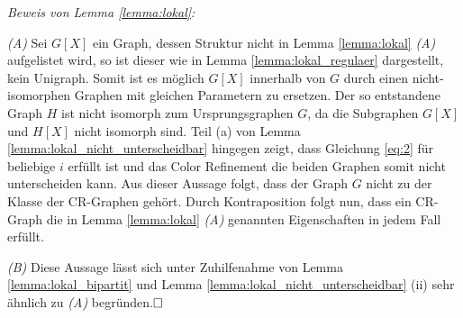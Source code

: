 \emph{Beweis von Lemma \ref{lemma:lokal}:}

\emph{(A)} Sei $G[X]$ ein Graph, dessen Struktur nicht in Lemma \ref{lemma:lokal} \emph{(A)} aufgelistet wird, so ist dieser wie in Lemma \ref{lemma:lokal_regulaer} dargestellt, kein Unigraph. Somit ist es möglich $G[X]$ innerhalb von $G$ durch einen nicht-isomorphen Graphen mit gleichen Parametern zu ersetzen. Der so entstandene Graph $H$ ist nicht isomorph zum Ursprungsgraphen $G$, da die Subgraphen $G[X]$ und $H[X]$ nicht isomorph sind. Teil (a) von Lemma \ref{lemma:lokal_nicht_unterscheidbar} hingegen zeigt, dass Gleichung \ref{eq:2} für beliebige $i$ erfüllt ist und das Color Refinement die beiden Graphen somit nicht unterscheiden kann. Aus dieser Aussage folgt, dass der Graph $G$ nicht zu der Klasse der CR-Graphen gehört. Durch Kontraposition folgt nun, dass ein CR-Graph die in Lemma \ref{lemma:lokal} \emph{(A)} genannten Eigenschaften in jedem Fall erfüllt.

\emph{(B)} Diese Aussage lässt sich unter Zuhilfenahme von Lemma \ref{lemma:lokal_bipartit} und Lemma \ref{lemma:lokal_nicht_unterscheidbar} (ii) sehr ähnlich zu \emph{(A)} begründen.$\hfill\square$

